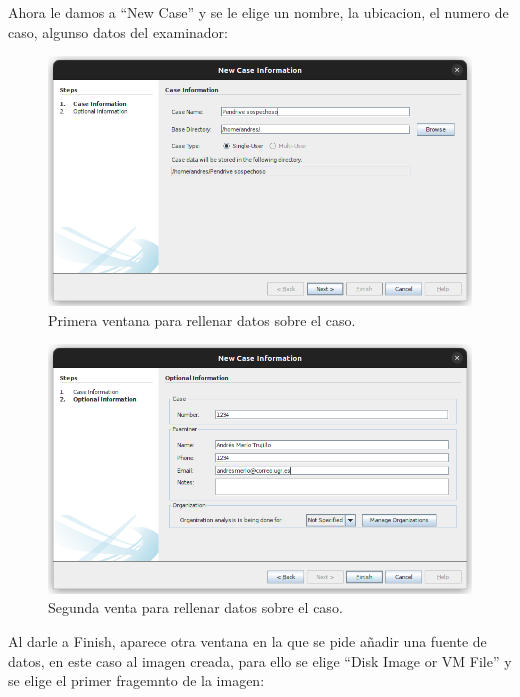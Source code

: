 \documentclass{article}
\begin{document}
Ahora le damos a ``New Case'' y se le elige un nombre, la ubicacion, el numero de caso, algunso datos del examinador:

\begin{figure}[H]
    \centering
    \includegraphics[width=\textwidth]{imagenes/Captura desde 2022-12-03 21-42-29.png}
    \caption{Primera ventana para rellenar datos sobre el caso.}
\end{figure}

\begin{figure}[H]
    \centering
    \includegraphics[width=\textwidth]{imagenes/Captura desde 2022-12-03 21-43-15.png}
    \caption{Segunda venta para rellenar datos sobre el caso.}
\end{figure}

Al darle a Finish, aparece otra ventana en la que se pide añadir una fuente de datos, en este caso al imagen creada, para ello se elige ``Disk Image or VM File'' y se elige el primer fragemnto de la imagen:
\end{document}
